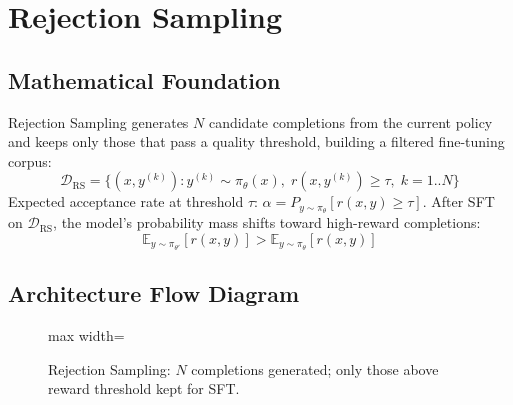 \newpage
\section{Rejection Sampling}

\subsection{Mathematical Foundation}
Rejection Sampling generates $N$ candidate completions from the current policy and keeps only those that pass a quality threshold, building a filtered fine-tuning corpus:
\begin{equation}
  \mathcal{D}_{\text{RS}} = \{(x, y^{(k)}) : y^{(k)} \sim \pi_\theta(x),\; r(x, y^{(k)}) \geq \tau,\; k = 1..N\}
\end{equation}
Expected acceptance rate at threshold $\tau$: $\alpha = P_{y \sim \pi_\theta}[r(x,y) \geq \tau]$. After SFT on $\mathcal{D}_{\text{RS}}$, the model's probability mass shifts toward high-reward completions:
\begin{equation}
  \mathbb{E}_{y \sim \pi_{\theta'}}[r(x,y)] > \mathbb{E}_{y \sim \pi_\theta}[r(x,y)]
\end{equation}

\subsection{Architecture Flow Diagram}

\begin{figure}[h]
\centering
\begin{adjustbox}{max width=\linewidth}
\end{adjustbox}
\caption{Rejection Sampling: $N$ completions generated; only those above reward threshold kept for SFT.}
\end{figure}

